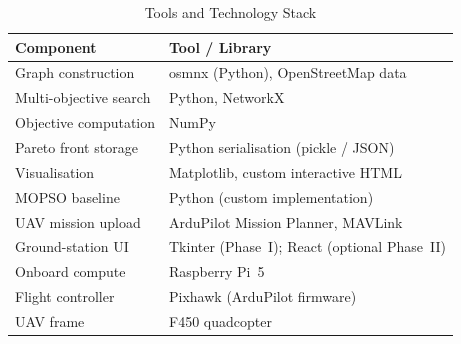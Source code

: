 \begin{table}[ht!]
\centering
\caption{Tools and Technology Stack}
\label{tab:tools}
\renewcommand{\arraystretch}{1.3}
\begin{tabular}{ll}
\toprule
\textbf{Component} & \textbf{Tool / Library} \\
\midrule
Graph construction      & osmnx (Python), OpenStreetMap data \\
Multi-objective search  & Python, NetworkX \cite{networkx} \\
Objective computation   & NumPy \\
Pareto front storage    & Python serialisation (pickle / JSON) \\
Visualisation           & Matplotlib, custom interactive HTML \\
MOPSO baseline          & Python (custom implementation) \cite{mopso} \\
UAV mission upload      & ArduPilot Mission Planner, MAVLink \cite{mavlink, ardupilot} \\
Ground-station UI       & Tkinter (Phase~I); React (optional Phase~II) \\
Onboard compute         & Raspberry Pi~5 \\
Flight controller       & Pixhawk (ArduPilot firmware) \\
UAV frame               & F450 quadcopter \\
\bottomrule
\end{tabular}
\end{table}